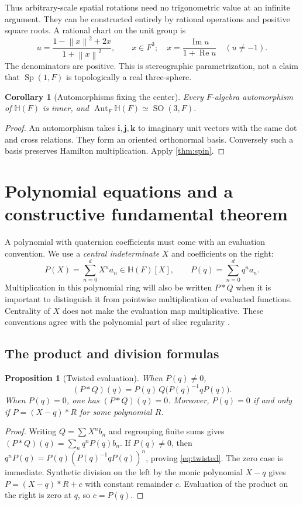 \documentclass[11pt,letterpaper]{article}
\newtheorem{proposition}[theorem]{Proposition}
\newtheorem{corollary}[theorem]{Corollary}
\theoremstyle{definition}
\newcommand{\HH}{\mathbb H}
\newcommand{\ii}{\mathbf i}
\newcommand{\jj}{\mathbf j}
\newcommand{\kk}{\mathbf k}
\newcommand{\norm}[1]{\left\lVert#1\right\rVert}
\DeclareMathOperator{\Rea}{Re}
\DeclareMathOperator{\Imag}{Im}
\DeclareMathOperator{\Sp}{Sp}
\DeclareMathOperator{\SO}{SO}
\begin{document}
Thus arbitrary-scale spatial rotations need no trigonometric value at an
infinite argument. They can be constructed entirely by rational operations and
positive square roots. A rational chart on the unit group is
\begin{equation}
 u=\frac{1-\norm x^2+2x}{1+\norm x^2},\qquad x\in F^3;
 \quad x=\frac{\Imag u}{1+\Rea u}\quad(u\ne-1).
 \label{eq:stereographic}
\end{equation}
The denominators are positive. This is stereographic parametrization, not a
claim that $\Sp(1,F)$ is topologically a real three-sphere.

\begin{corollary}[Automorphisms fixing the center]
Every $F$-algebra automorphism of $\HH(F)$ is inner, and
$\operatorname{Aut}_F\HH(F)\simeq\SO(3,F)$.
\end{corollary}
\begin{proof}
An automorphism takes $\ii,\jj,\kk$ to imaginary unit vectors with the same dot
and cross relations. They form an oriented orthonormal basis. Conversely such
a basis preserves Hamilton multiplication. Apply \cref{thm:spin}.
\end{proof}

\section{Polynomial equations and a constructive fundamental theorem}
\label{sec:polynomials}
A polynomial with quaternion coefficients must come with an evaluation
convention. We use a \emph{central indeterminate} $X$ and coefficients on the
right:
\[
 P(X)=\sum_{n=0}^d X^n a_n\in\HH(F)[X],\qquad
 P(q)=\sum_{n=0}^d q^n a_n.
\]
Multiplication in this polynomial ring will also be written $P*Q$ when it is
important to distinguish it from pointwise multiplication of evaluated
functions. Centrality of $X$ does not make the evaluation map multiplicative.
These conventions agree with the polynomial part of slice regularity
\cite{gp}.

\subsection{The product and division formulas}
\begin{proposition}[Twisted evaluation]
\label{prop:twisted}
When $P(q)\ne0$,
\begin{equation}
 (P*Q)(q)=P(q)\,Q\bigl(P(q)^{-1}qP(q)\bigr).
 \label{eq:twisted}
\end{equation}
When $P(q)=0$, one has $(P*Q)(q)=0$. Moreover, $P(q)=0$ if and only if
$P=(X-q)*R$ for some polynomial $R$.
\end{proposition}
\begin{proof}
Writing $Q=\sum X^n b_n$ and regrouping finite sums gives
$(P*Q)(q)=\sum_n q^nP(q)b_n$. If $P(q)\ne0$, then
$q^nP(q)=P(q)(P(q)^{-1}qP(q))^n$, proving \eqref{eq:twisted}. The zero case is
immediate. Synthetic division on the left by the monic polynomial $X-q$ gives
$P=(X-q)*R+c$ with constant remainder $c$. Evaluation of the product on the
right is zero at $q$, so $c=P(q)$.
\end{proof}
\end{document}
